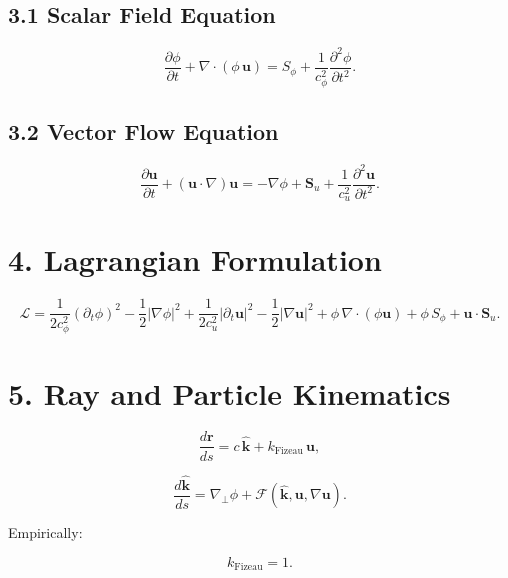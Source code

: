 \documentclass{article}
\begin{document}
\subsection*{3.1 Scalar Field Equation}


\[
\frac{\partial \phi}{\partial t}
+ \nabla\cdot(\phi\,\mathbf u)
=
S_\phi
+
\frac{1}{c_\phi^2}\frac{\partial^2 \phi}{\partial t^2}.
\]



\subsection*{3.2 Vector Flow Equation}


\[
\frac{\partial \mathbf u}{\partial t}
+ (\mathbf u\cdot\nabla)\mathbf u
=
-\nabla \phi
+ \mathbf S_u
+ \frac{1}{c_u^2}\frac{\partial^2 \mathbf u}{\partial t^2}.
\]



\section*{4. Lagrangian Formulation}



\[
\mathcal{L}
=
\frac{1}{2c_\phi^2}(\partial_t \phi)^2
- \frac{1}{2}|\nabla \phi|^2
+
\frac{1}{2c_u^2}|\partial_t \mathbf u|^2
- \frac{1}{2}|\nabla \mathbf u|^2
+
\phi\,\nabla\cdot(\phi\mathbf u)
+
\phi\,S_\phi
+
\mathbf u\cdot\mathbf S_u.
\]



\section*{5. Ray and Particle Kinematics}



\[
\frac{d\mathbf r}{ds}
= c\,\hat{\mathbf k}
+ k_{\mathrm{Fizeau}}\,\mathbf u,
\]




\[
\frac{d\hat{\mathbf k}}{ds}
= \nabla_\perp \phi
+ \mathcal{F}(\hat{\mathbf k},\mathbf u,\nabla\mathbf u).
\]



Empirically:


\[
k_{\mathrm{Fizeau}} = 1.
\]



\end{document}
